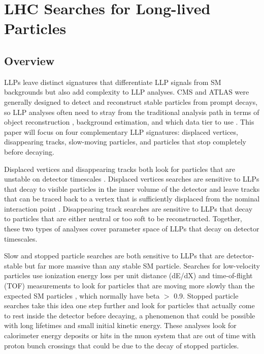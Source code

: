 \documentclass[12pt]{article}
\begin{document}
\section{LHC Searches for Long-lived Particles}
\subsection{Overview}
    LLPs leave distinct signatures that differentiate LLP signals from SM backgrounds but also add complexity to LLP analyses. CMS and ATLAS were generally designed to detect and reconstruct stable particles from prompt decays, so LLP analyses often need to stray from the traditional analysis path in terms of object reconstruction , background estimation, and which data tier to use . This paper will focus on four complementary LLP signatures: displaced vertices, disappearing tracks, slow-moving particles, and particles that stop completely before decaying.

    Displaced vertices and disappearing tracks both look for particles that are unstable on detector timescales . Displaced vertices searches are sensitive to LLPs that decay to visible particles in the inner volume  of the detector and leave tracks that can be traced back to a vertex that is sufficiently displaced from the nominal interaction point . Disappearing track searches are sensitive to LLPs that decay to particles that are either neutral or too soft to be reconstructed. Together, these two types of analyses cover  parameter space of LLPs that decay on detector timescales.

    Slow and stopped particle searches are both sensitive to LLPs that are detector-stable but far more massive than any stable SM particle. Searches for low-velocity particles use ionization energy loss per unit distance (dE/dX) and time-of-flight (TOF) measurements to look for particles that are moving more slowly than the expected SM particles , which normally  have beta $>$ 0.9. Stopped particle searches take this idea one step further and look for particles that actually come to rest inside the detector before decaying, a phenomenon that could be possible with long lifetimes and small initial kinetic energy. These analyses look for calorimeter energy deposits or hits in the muon system that are out of time with proton bunch crossings that could be due to the decay of stopped particles.
\end{document}
